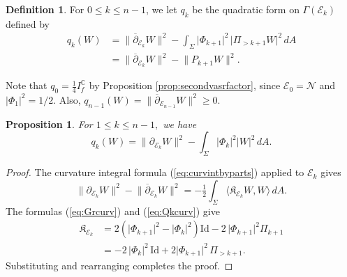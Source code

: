 \documentclass[11pt]{article}
\newtheorem{prop}[theorem]{Proposition}
\theoremstyle{definition}
\newtheorem{definition}[theorem]{Definition}
\newcommand{\C}{\mathbb{C}}
\numberwithin{equation}{section}
\begin{document}
\begin{definition}\label{defn:qkform}
	For $0 \leq k \leq n-1$, we let $q_k$ be the quadratic form on $\Gamma(\mathcal{E}_k)$ defined by
	\begin{equation*}
		\begin{aligned}
			q_k(W) & = \lVert \overline{\partial}_{\mathcal{E}_k} W \rVert^2 - \int_{\Sigma} \lvert \Phi_{k+1} \rvert^2 \, \lvert \Pi_{>k+1} W \rvert^2 \, dA \\
			       & = \lVert \overline{\partial}_{\mathcal{E}_k} W \rVert^2 - \lVert P_{k+1} W \rVert^2.                                                     
		\end{aligned}
	\end{equation*}
\end{definition}
Note that $q_0 = \tfrac{1}{4} I_f^\C$ by Proposition \ref{prop:secondvasrfactor}, since $\mathcal{E}_0 = \mathcal{N}$ and $\lvert \Phi_1 \rvert^2 = 1/2$. Also, $q_{n-1}(W) = \lVert \overline{\partial}_{\mathcal{E}_{n-1}} W \rVert^2 \geq 0$.

\begin{prop}\label{prop:qkequivform}
	For $1 \leq k \leq n-1,$ we have
	\begin{equation*}
		q_k(W) = \lVert \partial_{\mathcal{E}_k} W \rVert^2 - \int_{\Sigma} \lvert \Phi_k \rvert^2 \lvert W \rvert^2 \, dA.
	\end{equation*}
\end{prop}

\begin{proof}
	The curvature integral formula (\ref{eq:curvintbyparts}) applied to $\mathcal{E}_k$ gives
	\begin{equation*}
		\lVert \partial_{\mathcal{E}_k} W \rVert^2 - \lVert \overline{\partial}_{\mathcal{E}_k} W \rVert^2 = -\tfrac{1}{2} \int_{\Sigma} \langle \mathfrak{K}_{{\mathcal{E}_k}} W, W \rangle \, dA.
	\end{equation*}
	The formulas (\ref{eq:Grcurv}) and (\ref{eq:Qkcurv}) give
	\begin{equation*}
		\begin{aligned}
			\mathfrak{K}_{\mathcal{E}_k} & = 2 \left( \lvert \Phi_{k+1} \rvert^2 - \lvert \Phi_k \rvert^2 \right) \mathrm{Id} - 2  \, \lvert \Phi_{k+1} \rvert^2 \Pi_{k+1} \\
			    & = -2 \, \lvert \Phi_k \rvert^2 \, \mathrm{Id} + 2 \lvert \Phi_{k+1} \rvert^2 \, \Pi_{>k+1}.                                     
		\end{aligned}
	\end{equation*}
	Substituting and rearranging completes the proof.
\end{proof}
\end{document}
